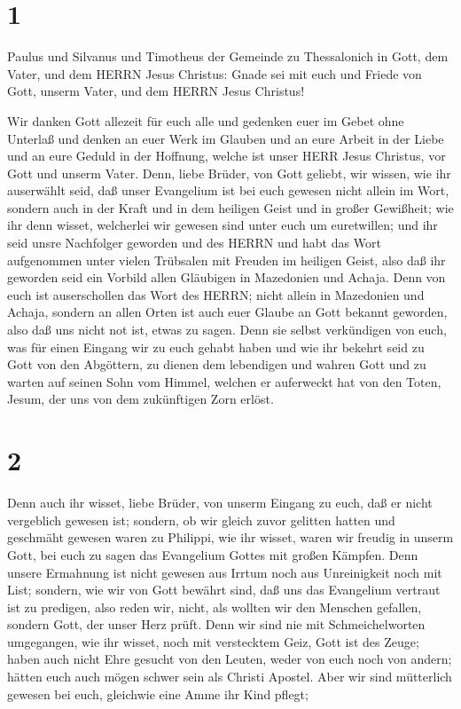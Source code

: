 \hypertarget{section}{%
\section{1}\label{section}}

 Paulus und Silvanus und Timotheus der Gemeinde zu
Thessalonich in Gott, dem Vater, und dem HERRN Jesus Christus: Gnade sei
mit euch und Friede von Gott, unserm Vater, und dem HERRN Jesus
Christus!

 Wir danken Gott allezeit für euch alle und gedenken euer im
Gebet ohne Unterlaß  und denken an euer Werk im Glauben und
an eure Arbeit in der Liebe und an eure Geduld in der Hoffnung, welche
ist unser HERR Jesus Christus, vor Gott und unserm Vater. 
Denn, liebe Brüder, von Gott geliebt, wir wissen, wie ihr auserwählt
seid,  daß unser Evangelium ist bei euch gewesen nicht
allein im Wort, sondern auch in der Kraft und in dem heiligen Geist und
in großer Gewißheit; wie ihr denn wisset, welcherlei wir gewesen sind
unter euch um euretwillen;  und ihr seid unsre Nachfolger
geworden und des HERRN und habt das Wort aufgenommen unter vielen
Trübsalen mit Freuden im heiligen Geist,  also daß ihr
geworden seid ein Vorbild allen Gläubigen in Mazedonien und Achaja.
 Denn von euch ist auserschollen das Wort des HERRN; nicht
allein in Mazedonien und Achaja, sondern an allen Orten ist auch euer
Glaube an Gott bekannt geworden, also daß uns nicht not ist, etwas zu
sagen.  Denn sie selbst verkündigen von euch, was für einen
Eingang wir zu euch gehabt haben und wie ihr bekehrt seid zu Gott von
den Abgöttern, zu dienen dem lebendigen und wahren Gott 
und zu warten auf seinen Sohn vom Himmel, welchen er auferweckt hat von
den Toten, Jesum, der uns von dem zukünftigen Zorn erlöst.

\hypertarget{section-1}{%
\section{2}\label{section-1}}

 Denn auch ihr wisset, liebe Brüder, von unserm Eingang zu
euch, daß er nicht vergeblich gewesen ist;  sondern, ob wir
gleich zuvor gelitten hatten und geschmäht gewesen waren zu Philippi,
wie ihr wisset, waren wir freudig in unserm Gott, bei euch zu sagen das
Evangelium Gottes mit großen Kämpfen.  Denn unsere Ermahnung
ist nicht gewesen aus Irrtum noch aus Unreinigkeit noch mit List;
 sondern, wie wir von Gott bewährt sind, daß uns das
Evangelium vertraut ist zu predigen, also reden wir, nicht, als wollten
wir den Menschen gefallen, sondern Gott, der unser Herz prüft.
 Denn wir sind nie mit Schmeichelworten umgegangen, wie ihr
wisset, noch mit verstecktem Geiz, Gott ist des Zeuge; 
haben auch nicht Ehre gesucht von den Leuten, weder von euch noch von
andern;  hätten euch auch mögen schwer sein als Christi
Apostel. Aber wir sind mütterlich gewesen bei euch, gleichwie eine Amme
ihr Kind pflegt;

